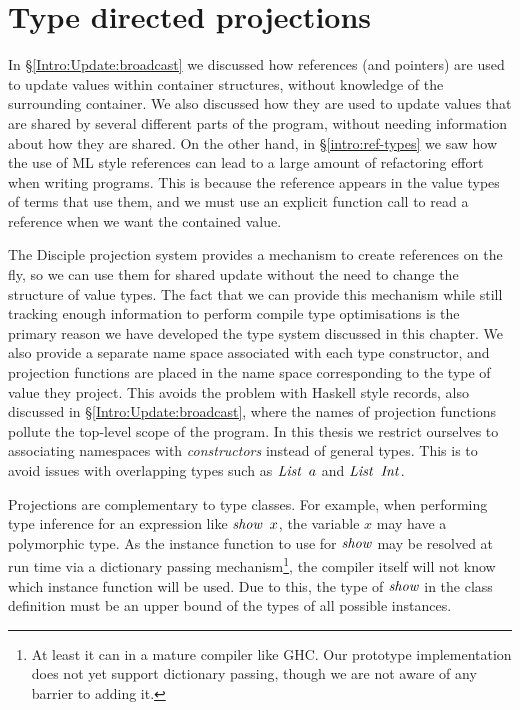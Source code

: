 
\clearpage{}
\section{Type directed projections}
\label{System:Projections}

In \S\ref{Intro:Update:broadcast} we discussed how references (and pointers) are used to update values within container structures, without knowledge of the surrounding container. We also discussed how they are used to update values that are shared by several different parts of the program, without needing information about how they are shared. On the other hand, in \S\ref{intro:ref-types} we saw how the use of ML style references can lead to a large amount of refactoring effort when writing programs. This is because the reference appears in the value types of terms that use them, and we must use an explicit function call to read a reference when we want the contained value.

The Disciple projection system provides a mechanism to create references on the fly, so we can use them for shared update without the need to change the structure of value types. The fact that we can provide this mechanism while still tracking enough information to perform compile type optimisations is the primary reason we have developed the type system discussed in this chapter. We also provide a separate name space associated with each type constructor, and  projection functions are placed in the name space corresponding to the type of value they project. This avoids the problem with Haskell style records, also discussed in \S\ref{Intro:Update:broadcast}, where the names of projection functions pollute the top-level scope of the program. In this thesis we restrict ourselves to associating namespaces with \emph{constructors} instead of general types. This is to avoid issues with overlapping types such as $\operatorname{\mathit{List}} \ a$ and $\operatorname{\mathit{List}} \ \operatorname{\mathit{Int}}$. 

Projections are complementary to type classes. For example, when performing type inference for an expression like $\operatorname{\mathit{show}} \ x$, the variable $x$ may have a polymorphic type. As the instance function to use for $\operatorname{\mathit{show}}$ may be resolved at run time via a dictionary passing mechanism\footnote{At least it can in a mature compiler like GHC. Our prototype implementation does not yet support dictionary passing, though we are not aware of any barrier to adding it. }, the compiler itself will not know which instance function will be used. Due to this, the type of $\operatorname{\mathit{show}}$ in the class definition must be an upper bound of the types of all possible instances.

